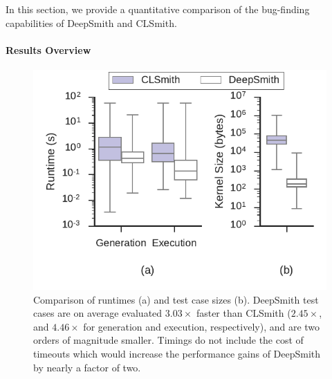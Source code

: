 In this section, we provide a quantitative comparison of the bug-finding capabilities of DeepSmith and CLSmith.

\paragraph{Results Overview}

\begin{table}
  \scriptsize %
  \centering %
  
  \caption{%
    Results from 48 hours of testing using CLSmith and DeepSmith. System \#. as per Table~\ref{tab:platforms}. $\pm$ denotes optimizations off ($-$) vs on ($+$). The remaining columns denote the number of build crash (\bc), build timeout (\bto), anomalous build failure (\abf), anomalous runtime crash (\arc), anomalous wrong-output (\awo), and pass (\textbf{\cmark}) results.
  }
  \label{tab:megatable}
\end{table}

\begin{figure}
  \centering %
  \includegraphics[width=\columnwidth]{build/img/vs-clsmith}%
  \vspace{-1em}
  \caption{%
    Comparison of runtimes (a) and test case sizes (b). DeepSmith test cases are on average evaluated $3.03\times$ faster than CLSmith ($2.45\times$, and $4.46\times$ for generation and execution, respectively), and are two orders of magnitude smaller. Timings do not include the cost of timeouts which would increase the performance gains of DeepSmith by nearly a factor of two.
  }%
  \label{fig:vs-clsmith} %
\end{figure}

